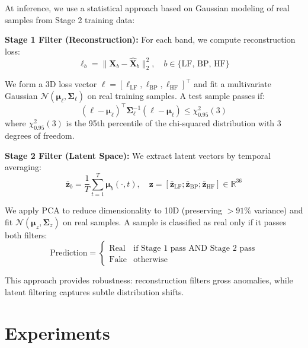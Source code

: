 \documentclass[11pt,twocolumn]{article}
\begin{document}
At inference, we use a statistical approach based on Gaussian modeling of real samples from Stage 2 training data:

\textbf{Stage 1 Filter (Reconstruction):} For each band, we compute reconstruction loss:
\begin{equation}
\ell_b = \|\mathbf{X}_b - \hat{\mathbf{X}}_b\|_2^2, \quad b \in \{\text{LF, BP, HF}\}
\end{equation}

We form a 3D loss vector $\mathbf{\ell} = [\ell_{\text{LF}}, \ell_{\text{BP}}, \ell_{\text{HF}}]^\top$ and fit a multivariate Gaussian $\mathcal{N}(\boldsymbol{\mu}_\ell, \boldsymbol{\Sigma}_\ell)$ on real training samples. A test sample passes if:
\begin{equation}
(\mathbf{\ell} - \boldsymbol{\mu}_\ell)^\top \boldsymbol{\Sigma}_\ell^{-1} (\mathbf{\ell} - \boldsymbol{\mu}_\ell) \leq \chi^2_{0.95}(3)
\end{equation}
where $\chi^2_{0.95}(3)$ is the 95th percentile of the chi-squared distribution with 3 degrees of freedom.

\textbf{Stage 2 Filter (Latent Space):} We extract latent vectors by temporal averaging:
\begin{equation}
\bar{\mathbf{z}}_b = \frac{1}{T}\sum_{t=1}^T \boldsymbol{\mu}_b(\cdot, t), \quad \mathbf{z} = [\bar{\mathbf{z}}_{\text{LF}}; \bar{\mathbf{z}}_{\text{BP}}; \bar{\mathbf{z}}_{\text{HF}}] \in \mathbb{R}^{36}
\end{equation}

We apply PCA to reduce dimensionality to 10D (preserving $>91\%$ variance) and fit $\mathcal{N}(\boldsymbol{\mu}_z, \boldsymbol{\Sigma}_z)$ on real samples. A sample is classified as real only if it passes both filters:
\begin{equation}
\text{Prediction} = \begin{cases}
\text{Real} & \text{if Stage 1 pass AND Stage 2 pass} \\
\text{Fake} & \text{otherwise}
\end{cases}
\end{equation}

This approach provides robustness: reconstruction filters gross anomalies, while latent filtering captures subtle distribution shifts.

\section{Experiments}
\label{sec:experiments}
\end{document}
